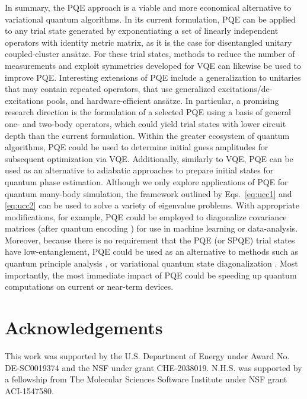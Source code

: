 \documentclass[aps,prx, reprint]{revtex4-2}
\begin{document}
In summary, the PQE approach is a viable and more economical alternative to variational quantum algorithms.
In its current formulation, PQE can be applied to any trial state generated by exponentiating a set of linearly independent operators with identity metric matrix, as it is the case for disentangled unitary coupled-cluster ans\"{a}tze.
For these trial states, methods to reduce the number of measurements and exploit symmetries \cite{yen2020measuring, verteletskyi2020measurement, setia2020reducing} developed for VQE can likewise be used to improve PQE.
Interesting extensions of PQE include a generalization to unitaries that may contain repeated operators, that use generalized excitations/de-excitations pools, and hardware-efficient ans\"{a}tze.
In particular, a promising research direction is the formulation of a selected PQE using a basis of general one- and two-body operators, which could yield trial states with lower circuit depth than the current formulation.
Within the greater ecosystem of quantum algorithms, PQE could be used to determine initial guess amplitudes for subsequent optimization via VQE.
Additionally, similarly to VQE, PQE can be used as an alternative to adiabatic approaches to prepare initial states for quantum phase estimation.
Although we only explore applications of PQE for quantum many-body simulation, the framework outlined by Eqs.~\eqref{eq:ucc1} and \eqref{eq:ucc2} can be used to solve a variety of eigenvalue problems.
With appropriate modifications, for example, PQE could be employed to diagonalize covariance matrices (after quantum encoding \cite{giovannetti2008quantum, lloyd2014quantum}) for use in machine learning or data-analysis.
Moreover, because there is no requirement that the PQE (or SPQE) trial states have low-entanglement, PQE could be used as an alternative to methods such as quantum principle analysis \cite{lloyd2014quantum}, or variational quantum state diagonalization \cite{larose2019variational}.
Most importantly, the most immediate impact of PQE could be speeding up quantum computations on current or near-term devices.

\section*{Acknowledgements}
This work was supported by the U.S. Department of Energy under Award No.  DE-SC0019374 and the NSF under grant CHE-2038019.
N.H.S. was supported by a fellowship from The Molecular Sciences Software Institute under NSF grant ACI-1547580.
\end{document}

